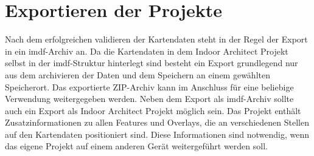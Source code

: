 \section{Exportieren der Projekte}
Nach dem erfolgreichen validieren der Kartendaten steht in der Regel der Export in ein \ac{imdf}-Archiv an.
Da die Kartendaten in dem Indoor Architect Projekt selbst in der \ac{imdf}-Struktur hinterlegt sind besteht ein Export grundlegend nur aus dem archivieren der Daten und dem Speichern an einem gewählten Speicherort.
Das exportierte ZIP-Archiv kann im Anschluss für eine beliebige Verwendung weitergegeben werden.\pbreak%
%
Neben dem Export als \ac{imdf}-Archiv sollte auch ein Export als Indoor Architect Projekt möglich sein.
Das Projekt enthält Zusatzinformationen zu allen Features und Overlays, die an verschiedenen Stellen auf den Kartendaten positioniert sind.
Diese Informationen sind notwendig, wenn das eigene Projekt auf einem anderen Gerät weitergeführt werden soll.
